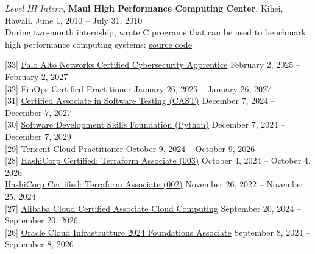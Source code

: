 \documentclass[10pt]{res} %
\begin{document}
\begin{resume}
{\sl Level III Intern}, {\bf Maui High Performance Computing Center}, Kihei, Hawaii. \hfill June 1, 2010 -- July 31, 2010 \\
During two-month internship, wrote C programs that can be used to benchmark high performance computing systems: \href{https://github.com/bjpeterdelacruz/hpc-benchmarks}{\color{blue}source code}

\vspace{0.025in}

\colorbox{darkblue}{}

{[33]} \phantom{0}\href{https://www.credly.com/badges/63a31149-b5dd-48c3-98e1-492c8f4a8a67}{\color{blue}Palo Alto Networks Certified Cybersecurity Apprentice} \hfill February 2, 2025 -- February 2, 2027 \\
{[32]} \phantom{0}\href{https://www.credly.com/badges/47e7f2a0-4c27-4447-9916-fdd1f7ce78f3}{\color{blue}FinOps Certified Practitioner} \hfill January 26, 2025 -- January 26, 2027 \\
{[31]} \phantom{0}\href{https://badges.peoplecert.org/Badge/en/2/2DCC0402-CF35-4C25-A9A8-50704C9C1A8E}{\color{blue}Certified Associate in Software Testing (CAST)} \hfill December 7, 2024 -- December 7, 2027 \\
{[30]} \phantom{0}\href{https://badges.peoplecert.org/Badge/en/2/4062E1F4-281E-47CB-9608-400A9BDA9FD2}{\color{blue}Software Development Skills Foundation (Python)} \hfill December 7, 2024 -- December 7, 2029 \\
{[29]} \phantom{0}\href{https://www.credly.com/badges/dfae791e-d39e-4826-b1ad-6665f2615bc3}{\color{blue}Tencent Cloud Practitioner} \hfill October 9, 2024 -- October 9, 2026 \\
{[28]} \phantom{0}\href{https://www.credly.com/badges/e2a8dd52-1f9e-4483-b10c-c3c8887f5b8c}{\color{blue}HashiCorp Certified: Terraform Associate (003)} \hfill October 4, 2024 -- October 4, 2026 \\
\phantom{[14]} \phantom{0}\href{https://www.credly.com/badges/c69a5d36-453b-4ad7-a7a6-3b573b69d94a}{\color{blue}HashiCorp Certified: Terraform Associate (002)} \hfill {\color{red}November 26, 2022 -- November 25, 2024} \\
{[27]} \phantom{0}\href{https://aliyun-aps-cloud-public.oss-cn-hangzhou.aliyuncs.com/img_b4719ddbcb8fb669fe5c20899b0ce3fb.png}{\color{blue}Alibaba Cloud Certified Associate Cloud Computing} \hfill September 20, 2024 -- September 20, 2026 \\
{[26]} \phantom{0}\href{https://catalog-education.oracle.com/pls/certview/sharebadge?id=9F6541DFD004D9E0F856E094EB2177D91A73C97AFC3DCDC58659B9072C79DC78}{\color{blue}Oracle Cloud Infrastructure 2024 Foundations Associate} \hfill September 8, 2024 -- September 8, 2026 \\

\end{resume}
\end{document}
